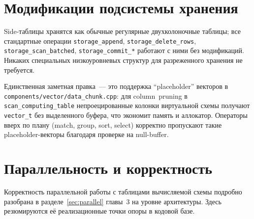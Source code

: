 \section{Модификации подсистемы хранения}

Side-таблицы хранятся как обычные регулярные двухколоночные
таблицы; все стандартные операции \texttt{storage\_append},
\texttt{storage\_delete\_rows}, \texttt{storage\_scan\_batched},
\texttt{storage\_commit\_*} работают с ними без модификаций.
Никаких специальных низкоуровневых структур для разреженного
хранения не требуется.

Единственная заметная правка~--- это поддержка ``placeholder''
векторов в \texttt{components/vector/data\_chunk.cpp}: для
column~pruning в \texttt{scan\_computing\_table} непроецированные
колонки виртуальной схемы получают \texttt{vector\_t} без
выделенного буфера, что экономит память и аллокатор. Операторы
вверх по плану (match, group, sort, select) корректно пропускают
такие placeholder-векторы благодаря проверке на null-buffer.

\section{Параллельность и корректность}

Корректность параллельной работы с таблицами вычисляемой схемы
подробно разобрана в разделе~\ref{sec:parallel} главы~3 на уровне
архитектуры. Здесь резюмируются её реализационные точки опоры в
кодовой базе.

